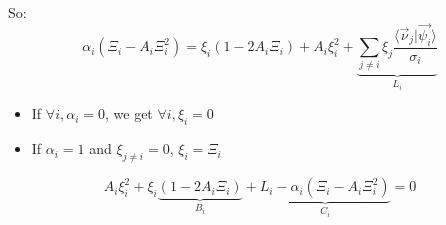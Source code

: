 \documentclass[aps,12pt]{revtex4}
\begin{document}
So: 
\begin{equation}
	\alpha_i\left( \Xi_i - A_i \Xi_i^2 \right) = \xi_i (1-2A_i\Xi_i) + A_i \xi_i^2 +
	\underbrace{\sum_{j\not=i} \xi_j \dfrac{\langle \vec{\nu}_j \vert \vec{\psi_i} \rangle}{\sigma_i}}_{L_i}
\end{equation}

\begin{itemize}
\item If $\forall i, \alpha_i=0$, we get $\forall i, \xi_i=0$
\item If $\alpha_i=1$ and $\xi_{j\not=i}=0$, $\xi_i=\Xi_i$
\end{itemize}

\begin{equation}
A_i \xi_i^2 + \xi_i \underbrace{(1-2A_i\Xi_i)}_{B_i} + \underbrace{L_i - \alpha_i\left( \Xi_i - A_i \Xi_i^2 \right)}_{C_i} = 0
\end{equation}
\end{document}
